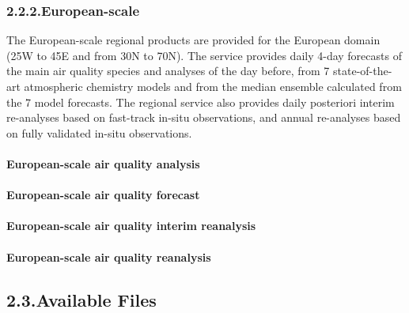 \documentclass[9pt]{article}
\begin{document}
\subsubsection{2.2.2.\hspace*{0.5em}European-scale}\label{sec-european-scale}%

\noindent{}The European-scale regional products are provided for the European domain (25\textdegree{}W to 45\textdegree{}E and from 30\textdegree{}N to 70\textdegree{}N). 
The service provides daily 4-day forecasts of the main air quality species and analyses of the day before, from 7 state-of-the-art atmospheric chemistry models and from the median ensemble calculated from the 7 model forecasts. 
The regional service also provides daily posteriori interim re-analyses based on fast-track in-situ observations, and annual re-analyses based on fully validated in-situ observations.%

\paragraph{European-scale air quality analysis}\label{sec-european-scale-air-quality-analysis}%

\paragraph{European-scale air quality forecast}\label{sec-european-scale-air-quality-forecast}%

\paragraph{European-scale air quality interim reanalysis}\label{sec-european-scale-air-quality-interim-reanalysis}%

\paragraph{European-scale air quality reanalysis}\label{sec-european-scale-air-quality-reanalysis}%

\subsection{2.3.\hspace*{0.5em}Available Files}\label{sec-available-files}%
\end{document}

